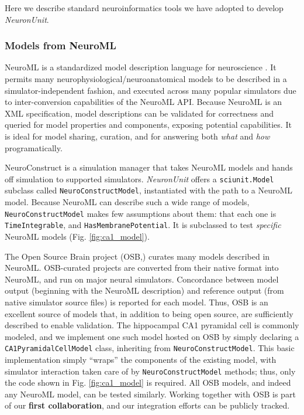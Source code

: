 \documentclass[11pt,letterpaper]{article}
\let\verbx\lstinline
\begin{document}
\label{sec:neuronunit_acitivities}
Here we describe standard neuroinformatics tools we have adopted to develop \textit{NeuronUnit}\cite{neurounit_url}.  

\subsubsection{Models from NeuroML}\label{sec:neuroml_models}
NeuroML is a standardized model description language for neuroscience \cite{gleeson_neuroml:_2010}. 
It permits many neurophysiological/neuroanatomical models to be described in a simulator-independent fashion, and executed across many popular simulators due to inter-conversion capabilities of the NeuroML API. 
Because NeuroML is an XML specification, model descriptions can be validated for correctness and queried for model properties and components, exposing potential capabilities. 
It is ideal for model sharing, curation, and for answering both \textit{what} and \textit{how} programatically.  

NeuroConstruct\cite{neuroconstruct_url,gleeson_neuroconstruct:_2007} is a simulation manager that takes NeuroML models and hands off simulation to supported simulators. 
\textit{NeuronUnit} offers a \verbx{sciunit.Model} subclass called \verbx{NeuroConstructModel}, instantiated with the path to a NeuroML model.  
Because NeuroML can describe such a wide range of models, \verbx{NeuroConstructModel} makes few assumptions about them: that each one is \verbx{TimeIntegrable}, and \verbx{HasMembranePotential}.  
It is subclassed to test \textit{specific} NeuroML models (Fig. \ref{fig:ca1_model}). 

The Open Source Brain project (OSB,\cite{osb_url}) curates many models described in NeuroML. 
OSB-curated projects are converted from their native format into NeuroML, and run on major neural simulators\cite{neuron_url,genesis_url,nest_url,moose_url}. 
Concordance between model output (beginning with the NeuroML description) and reference output (from native simulator source files) is reported for each model. 
Thus, OSB is an excellent source of models that, in addition to being open source, are sufficiently described to enable validation. 
The hippocampal CA1 pyramidal cell is commonly modeled, and we implement one such model hosted on OSB\cite{osb_ca1_url} by simply declaring a \verbx{CA1PyramidalCellModel} class, inheriting from \verbx{NeuroConstructModel}.  
This basic implementation simply ``wraps'' the components of the existing model, with simulator interaction taken care of by \verbx{NeuroConstructModel} methods; 
thus, only the code shown in Fig. \ref{fig:ca1_model} is required. 
All OSB models, and indeed any NeuroML model, can be tested similarly. 
Working together with OSB is part of our \textbf{first collaboration}, and our integration efforts can be publicly tracked\cite{neuroconstruct_rgerkin_url}.  
\end{document}

